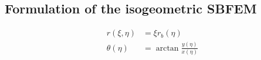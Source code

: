 \subsection{Formulation of the isogeometric SBFEM}

    \begin{subequations}
        \begin{align}
            r(\xi,\eta) &= \xi r_b(\eta) \\
            \theta(\eta) &= \arctan \frac{y(\eta)}{x(\eta)}
        \end{align}
    \label{iso_eq:isosbfem_coordinate_transformation}
    \end{subequations}

\pagebreak